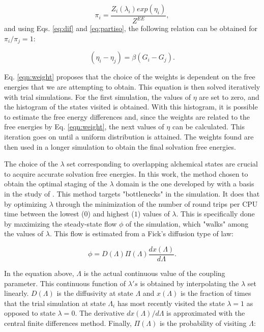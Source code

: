 \begin{equation}
\pi_{i} = \dfrac{Z_{i}(\lambda_{i}) exp(\eta_{i})}{Z^{EE}} ,
\label{eqn:wei1}
\end{equation} 
and using Eqs. \ref{eq:dif} and \ref {eq:partiso}, the following relation can be obtained for $\pi_{i}/\pi_{j}=1$:

\begin{equation}
(\eta_{i} - \eta_{j}) = \beta(G_i-G_j).
\label{eqn:weight}
\end{equation}

Eq. \eqref{eqn:weight} proposes that the choice of the weights is dependent on the free energies that we are attempting to obtain. This equation is then solved iteratively with trial simulations. For the first simulation, the values of $\eta$ are set to zero, and the histogram of the states visited is obtained. With this histogram, it is possible to estimate the free energy differences and, since the weights are related to the free energies by Eq. \eqref{eqn:weight}, the next values of $\eta$ can be calculated. This iteration goes on until a uniform distribution is attained. The weights found are then used in a longer simulation to obtain the final solvation free energies.

The choice of the $\lambda$ set corresponding to overlapping alchemical states are crucial to acquire accurate solvation free energies. In this work, the method chosen to obtain the optimal staging of the $\lambda$ domain is the one developed by  with a basis in the study of  . This method targets "bottlenecks" in the simulation. It does that by optimizing $\lambda$ through the minimization of the number of round trips per CPU time between the lowest ($0$) and highest ($1$) values of $\lambda$. This is specifically done by maximizing the steady-state flow $\phi$ of the simulation, which "walks" among the values of $\lambda$. This flow is estimated from a Fick's diffusion type of law:

\begin{equation}
\phi = D(\Lambda) \Pi (\Lambda) \dfrac{dx(\Lambda)}{d \Lambda}.
\label{eqn:stream}
\end{equation}

In the equation above, $\Lambda$ is the actual continuous value of the coupling parameter. This continuous function of $\lambda 's$ is obtained by interpolating the $\lambda$ set linearly. $D(\Lambda)$ is the diffusivity at  state $\Lambda$ and $x(\Lambda)$ is the fraction of times that the trial simulation at state $\Lambda_{i}$ has most recently visited the state $\lambda=1$ as opposed to state $\lambda=0$. The derivative ${dx(\Lambda)}/{d \Lambda}$ is approximated with the central finite differences method. Finally, $\Pi (\Lambda)$ is the probability of visiting $\Lambda$:


